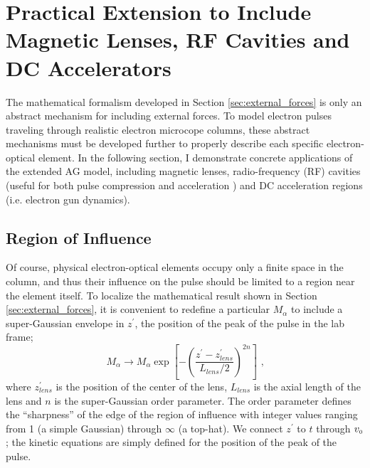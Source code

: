 
\section{Practical Extension to Include Magnetic Lenses, RF Cavities and DC Accelerators}

The mathematical formalism developed in Section \ref{sec:external_forces} is only an abstract mechanism for including external forces.
To model electron pulses traveling through realistic electron microcope columns, these abstract mechanisms must be developed further to properly describe each specific electron-optical element.
In the following section, I demonstrate concrete applications of the extended AG model, including magnetic lenses, radio-frequency (RF) cavities (useful for both pulse compression \cite{oudheusden_electron_2007} and acceleration %
) and DC acceleration regions (i.e. electron gun dynamics).

\subsection{Region of Influence}

Of course, physical electron-optical elements occupy only a finite space in the column, and thus their influence on the pulse should be limited to a region near the element itself.
To localize the mathematical result shown in Section \ref{sec:external_forces}, it is convenient to redefine a particular $M_{\alpha}$ to include a super-Gaussian envelope in $z^{\prime}$, the position of the peak of the pulse in the lab frame;
\begin{equation} \label{eq:reg_of_influence}
  M_{\alpha} \to M_{\alpha} \exp \left [ - \left (  \frac{ z^{\prime} - z_{lens}^{\prime} }{ L_{lens} / 2 } \right )^{ 2 n } \right ] \text{ ,}
\end{equation}
where $z_{lens}^{\prime}$ is the position of the center of the lens, $L_{lens}$ is the axial length of the lens and $n$ is the super-Gaussian order parameter.
The order parameter defines the ``sharpness'' of the edge of the region of influence with integer values ranging from 1 (a simple Gaussian) through $\infty$ (a top-hat).
We connect $z^{\prime}$ to $t$ through $ v_{{\scriptscriptstyle 0}} $; the kinetic equations are simply defined for the position of the peak of the pulse.

